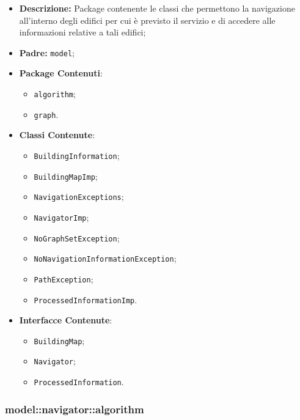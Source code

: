 \documentclass[../DefinizioneDiProdotto.tex]{subfiles}
\begin{document}
    \begin{itemize}
\item \textbf{Descrizione:} Package contenente le classi che permettono la navigazione all'interno degli edifici per cui è previsto il servizio e di accedere alle informazioni relative a tali edifici;
\item \textbf{Padre:} \texttt{model};
\item \textbf{Package Contenuti}:
\begin{itemize}
\item \texttt{algorithm};

\item \texttt{graph}.

\end{itemize}
\item \textbf{Classi Contenute}:
\begin{itemize}
\item \texttt{BuildingInformation};

\item \texttt{BuildingMapImp};

\item \texttt{NavigationExceptions};

\item \texttt{NavigatorImp};

\item \texttt{NoGraphSetException};

\item \texttt{NoNavigationInformationException};

\item \texttt{PathException};

\item \texttt{ProcessedInformationImp}.

\end{itemize}
\item \textbf{Interfacce Contenute}:
\begin{itemize}
\item \texttt{BuildingMap};

\item \texttt{Navigator};

\item \texttt{ProcessedInformation}.

\end{itemize}
\end{itemize}

\subsubsection{model::\-navigator::\-algorithm}
\end{document}
